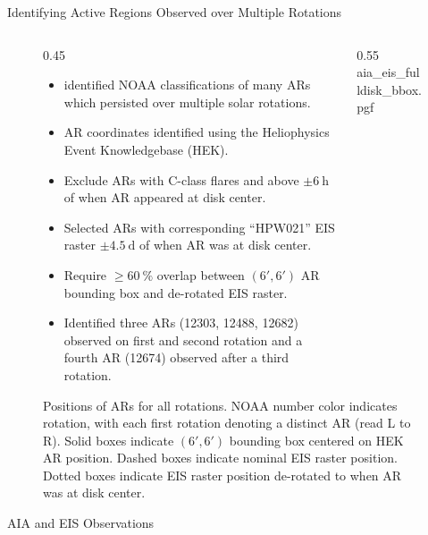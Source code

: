 \documentclass[final]{beamer}
\newlength{\colwidth}
\begin{document}
\begin{frame}[t]
\begin{columns}[t]
\begin{column}{\colwidth}
\begin{block}{Identifying Active Regions Observed over Multiple Rotations}
    \begin{figure}
      \begin{columns}[T]
        \begin{column}{0.45\colwidth}
            \begin{itemize}
              \item \citet{mason_active_2023} identified NOAA classifications of many ARs which persisted over multiple solar rotations.
              \item AR coordinates identified using the Heliophysics Event Knowledgebase (HEK).
              \item \alert{Exclude ARs with C-class flares and above} $\pm\SI{6}{\hour}$ of when AR appeared at disk center.
              \item Selected ARs with corresponding ``HPW021'' EIS raster $\pm\SI{4.5}{\day}$ of when AR was at disk center.
              \item Require $\ge\SI{60}{\percent}$ overlap between $(\ang{;6;},\ang{;6;})$ AR bounding box and de-rotated EIS raster.
              \item Identified three ARs (\alert{12303, 12488, 12682}) observed on \textcolor{C0}{first} and \textcolor{C1}{second} rotation and a fourth AR (\alert{12674}) observed after a \textcolor{C2}{third} rotation. 
            \end{itemize}
          \caption{Positions of ARs for all rotations. NOAA number color indicates rotation, with each \textcolor{C0}{first} rotation denoting a distinct AR (read L to R). Solid boxes indicate $(\ang{;6;},\ang{;6;})$ bounding box centered on HEK AR position. Dashed boxes indicate nominal EIS raster position. Dotted boxes indicate EIS raster position de-rotated to when AR was at disk center.}
          \label{fig:aia_eis_fov}
        \end{column}
        \begin{column}{0.55\colwidth}
          {aia_eis_fulldisk_bbox.pgf}
        \end{column}
      \end{columns}
    \end{figure}
  \end{block}

  \vspace{-35pt}

  \begin{block}{AIA and EIS Observations}
    

\end{block}
\end{column}
\end{columns}
\end{frame}
\end{document}

